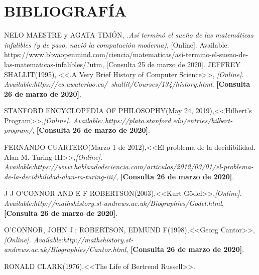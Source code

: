 \documentclass[12pt]{article}
\begin{document}
\section{ BIBLIOGRAFÍA}
\large
\vspace{15PT}
\begin{thebibliography}{X}
 \textsc{NELO MAESTRE } y \textsc{AGATA TIMÓN},
\textit{.Así terminó el sueño de las matemáticas infalibles (y de paso, nació la computación moderna)}, [Online]. Available: https://www.bbvaopenmind.com/ciencia/matematicas/asi-termino-el-sueno-de-las-matematicas-infalibles/?utm, [Consulta 25 de marzo de 2020].
 \textsc{JEFFREY SHALLIT}(1995),
<<.A Very Brief History of Computer Science>>,
\textit{[Online]. Available:https://cs.uwaterloo.ca/~shallit/Courses/134/history.html}, \textbf{[Consulta 26 de marzo de 2020]}.

 \textsc{STANFORD ENCYCLOPEDIA OF PHILOSOPHY}(May 24, 2019),<<Hilbert’s Program>>,\textit{[Online]. Available:.https://plato.stanford.edu/entries/hilbert-program/}, \textbf{[Consulta 26 de marzo de 2020]}.

 \textsc{FERNANDO CUARTERO}(Marzo 1 de 2012),<<El problema de la decidibilidad. Alan M. Turing III>>,\textit{[Online]. Available:https://www.hablandodeciencia.com/articulos/2012/03/01/el-problema-de-la-decidibilidad-alan-m-turing-iii/}, \textbf{[Consulta 26 de marzo de 2020]}.

 \textsc{J J O'CONNOR AND E F ROBERTSON}(2003),<<Kurt Gödel>>,\textit{[Online]. Available:http://mathshistory.st-andrews.ac.uk/Biographies/Godel.html}, \textbf{[Consulta 26 de marzo de 2020]}.

 \textsc{O'CONNOR, JOHN J.; ROBERTSON, EDMUND F}(1998),<<Georg Cantor>>,\textit{[Online]. Available:http://mathshistory.st-andrews.ac.uk/Biographies/Cantor.html}, \textbf{[Consulta 26 de marzo de 2020]}.

 \textsc{RONALD CLARK}(1976),<<The Life of Bertrend Russell>>.

\end{thebibliography}
\end{document}
